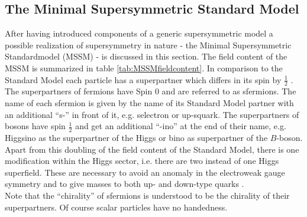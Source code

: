\subsection{The Minimal Supersymmetric Standard Model}
After having introduced components of a generic supersymmetric model a possible realization of supersymmetry in nature - the Minimal Supersymmetric Standardmodel (MSSM) - is discussed in this section. 
The field content of the MSSM is summarized in table \ref{tab:MSSMfieldcontent}. In comparison to the Standard Model each particle has a superpartner which differs in its spin by $\frac{1}{2}$ . The superpartners of fermions have Spin 0 and are referred to as sfermions. The name of each sfermion is given by the name of its Standard Model partner with an additional ``s-'' in front of it, e.g. selectron or up-squark. The superpartners of bosons have spin $\frac{1}{2}$ and get an additional ``-ino'' at the end of their name, e.g. Higgsino as the superpartner of the Higgs or bino as superpartner of the $B$-boson.\\
Apart from this doubling of the field content of the Standard Model, there is one modification within the Higgs sector, i.e. there are two instead of one Higgs superfield. These are necessary to avoid an anomaly in the electroweak gauge symmetry and to give masses to both up- and down-type quarks \cite[page 8]{Martin:1997ns}.\\
Note that the ``chirality'' of sfermions is understood to be the chirality of their superpartners. Of course scalar particles have no handedness.
